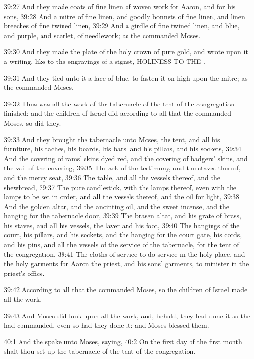 39:27 And they made coats of fine linen of woven work for Aaron, and
for his sons, 39:28 And a mitre of fine linen, and goodly bonnets of
fine linen, and linen breeches of fine twined linen, 39:29 And a
girdle of fine twined linen, and blue, and purple, and scarlet, of
needlework; as the \LORD commanded Moses.

39:30 And they made the plate of the holy crown of pure gold, and
wrote upon it a writing, like to the engravings of a signet, HOLINESS
TO THE \LORD.

39:31 And they tied unto it a lace of blue, to fasten it on high upon
the mitre; as the \LORD commanded Moses.

39:32 Thus was all the work of the tabernacle of the tent of the
congregation finished: and the children of Israel did according to all
that the \LORD commanded Moses, so did they.

39:33 And they brought the tabernacle unto Moses, the tent, and all
his furniture, his taches, his boards, his bars, and his pillars, and
his sockets, 39:34 And the covering of rams' skins dyed red, and the
covering of badgers' skins, and the vail of the covering, 39:35 The
ark of the testimony, and the staves thereof, and the mercy seat,
39:36 The table, and all the vessels thereof, and the shewbread, 39:37
The pure candlestick, with the lamps thereof, even with the lamps to
be set in order, and all the vessels thereof, and the oil for light,
39:38 And the golden altar, and the anointing oil, and the sweet
incense, and the hanging for the tabernacle door, 39:39 The brasen
altar, and his grate of brass, his staves, and all his vessels, the
laver and his foot, 39:40 The hangings of the court, his pillars, and
his sockets, and the hanging for the court gate, his cords, and his
pins, and all the vessels of the service of the tabernacle, for the
tent of the congregation, 39:41 The cloths of service to do service in
the holy place, and the holy garments for Aaron the priest, and his
sons' garments, to minister in the priest's office.

39:42 According to all that the \LORD commanded Moses, so the children
of Israel made all the work.

39:43 And Moses did look upon all the work, and, behold, they had done
it as the \LORD had commanded, even so had they done it: and Moses
blessed them.

40:1 And the \LORD spake unto Moses, saying, 40:2 On the first day of
the first month shalt thou set up the tabernacle of the tent of the
congregation.

